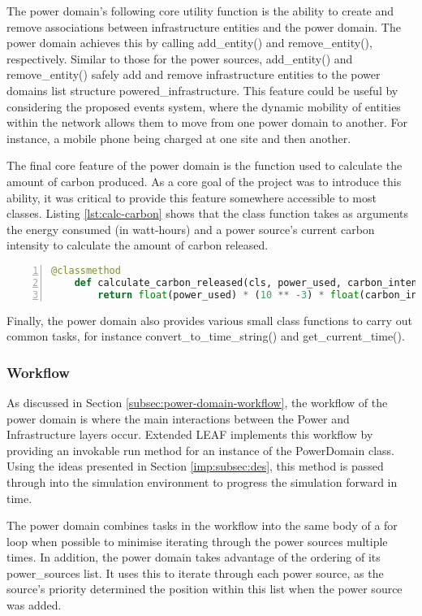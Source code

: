 \documentclass{l4proj}
\begin{document}
The power domain's following core utility function is the ability to create and remove associations between infrastructure entities and the power domain.
The power domain achieves this by calling add\_entity() and remove\_entity(), respectively.
Similar to those for the power sources, add\_entity() and remove\_entity() safely add and remove infrastructure entities to the power domains list structure powered\_infrastructure.
This feature could be useful by considering the proposed events system, where the dynamic mobility of entities within the network allows them to move from one power domain to another. For instance, a mobile phone being charged at one site and then another.

The final core feature of the power domain is the function used to calculate the amount of carbon produced.
As a core goal of the project was to introduce this ability, it was critical to provide this feature somewhere accessible to most classes.
Listing \ref{lst:calc-carbon} shows that the class function takes as arguments the energy consumed (in watt-hours) and a power source's current carbon intensity to calculate the amount of carbon released.
\begin{lstlisting}[language=python, numbers=left, caption={Listing showing the class method used to calculate carbon emissions.}, label=lst:calc-carbon]
    @classmethod
    def calculate_carbon_released(cls, power_used, carbon_intensity) -> float:
        return float(power_used) * (10 ** -3) * float(carbon_intensity)
\end{lstlisting}

Finally, the power domain also provides various small class functions to carry out common tasks, for instance convert\_to\_time\_string() and get\_current\_time().

\subsubsection{Workflow}\label{imp:subsec:workflow}
As discussed in Section \ref{subsec:power-domain-workflow}, the workflow of the power domain is where the main interactions between the Power and Infrastructure layers occur.
Extended LEAF implements this workflow by providing an invokable run method for an instance of the PowerDomain class.
Using the ideas presented in Section \ref{imp:subsec:des}, this method is passed through into the simulation environment to progress the simulation forward in time.

The power domain combines tasks in the workflow into the same body of a for loop when possible to minimise iterating through the power sources multiple times.
In addition, the power domain takes advantage of the ordering of its power\_sources list. It uses this to iterate through each power source, as the source's priority determined the position within this list when the power source was added.
\end{document}
